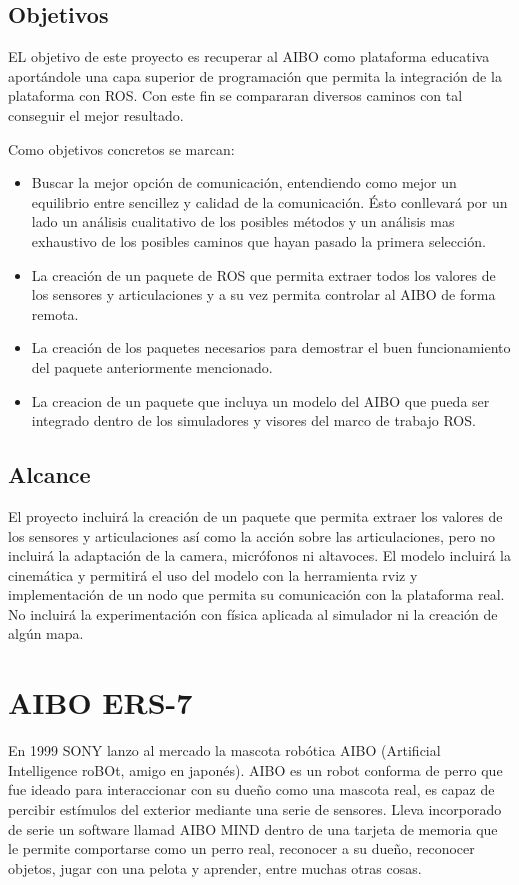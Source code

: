 \documentclass[12pt,a4paper,final,twoside]{article}
\begin{document}
\subsection{Objetivos}
EL objetivo de este proyecto es recuperar al AIBO como plataforma educativa aportándole una capa superior de programación que permita la integración de la plataforma con ROS.
Con este fin  se compararan diversos caminos con tal conseguir el mejor resultado.

Como objetivos concretos se marcan:
\begin{itemize}
\item Buscar la mejor opción de comunicación, entendiendo como mejor un equilibrio entre sencillez y calidad de la comunicación. Ésto conllevará por un lado  un análisis cualitativo de los posibles métodos y un análisis mas exhaustivo de los posibles caminos que hayan pasado la primera selección.

\item La creación de un paquete de ROS que permita extraer todos los valores de los sensores y articulaciones y a su vez permita controlar al AIBO de forma remota.

\item La creación de los paquetes necesarios para demostrar el buen funcionamiento del paquete anteriormente mencionado.

\item La creacion de un paquete que incluya un modelo del AIBO que pueda ser integrado dentro de los simuladores y visores del marco de trabajo ROS. 
\end{itemize}

\subsection{Alcance}
El proyecto incluirá la creación de un paquete que permita extraer los valores de los sensores y articulaciones así como la acción sobre las articulaciones, pero no incluirá la adaptación de la camera, micrófonos ni altavoces.
El modelo incluirá la cinemática y permitirá el uso del modelo con la herramienta rviz y implementación de un nodo que permita su comunicación con la plataforma real. No incluirá la experimentación con física aplicada al simulador ni la creación de algún mapa.  

\newpage
\clearpage

\section{AIBO ERS-7}\label{secaibo}
En 1999 SONY lanzo al mercado la mascota robótica AIBO (Artificial Intelligence roBOt, amigo en japonés). AIBO es un robot conforma de perro 
que fue ideado para interaccionar con su dueño como una mascota real, es capaz de percibir estímulos del exterior mediante una serie de sensores. Lleva incorporado de serie un software llamad AIBO MIND dentro de una tarjeta de memoria que le permite comportarse como un perro real, reconocer a su dueño, reconocer objetos, jugar con una pelota y aprender, entre muchas otras cosas.
\end{document}

